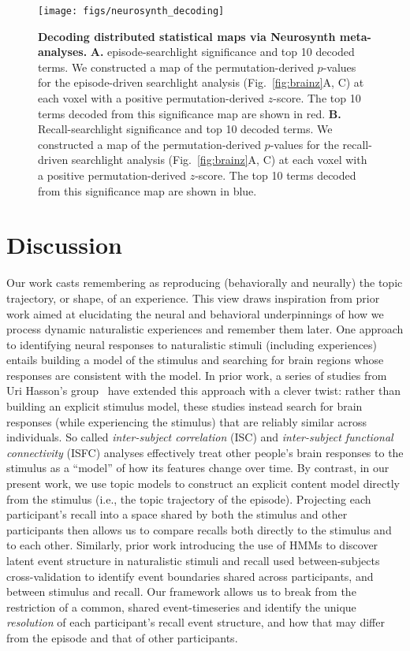 \documentclass{article}
\begin{document}
\begin{figure}[t]
\centering
\texttt{[image: figs/neurosynth\_decoding]}
\caption{\small \textbf{Decoding distributed statistical maps via Neurosynth meta-analyses.} \textbf{A.} episode-searchlight significance and top 10 decoded terms.  We constructed a map of the permutation-derived $p$-values for the episode-driven searchlight analysis (Fig.~\ref{fig:brainz}A, C) at each voxel with a positive permutation-derived $z$-score.  The top 10 terms decoded from this significance map are shown in red.  \textbf{B.} Recall-searchlight significance and top 10 decoded terms.  We constructed a map of the permutation-derived $p$-values for the recall-driven searchlight analysis (Fig.~\ref{fig:brainz}A, C) at each voxel with a positive permutation-derived $z$-score.  The top 10 terms decoded from this significance map are shown in blue.}
\label{fig:neurosynth}
\end{figure}
\FloatBarrier


\section*{Discussion}
\label{sec:discussion}

Our work casts remembering as reproducing (behaviorally and neurally) the topic trajectory, or shape, of an experience.  This view draws inspiration from prior work aimed at elucidating the neural and behavioral underpinnings of how we process dynamic naturalistic experiences and remember them later.  One approach to identifying neural responses to naturalistic stimuli (including experiences) entails building a model of the stimulus and searching for brain regions whose responses are consistent with the model.  In prior work, a series of studies from Uri Hasson's group~\citep{LernEtal11, SimoEtal16, ChenEtal17, BaldEtal17, ZadbEtal17} have extended this approach with a clever twist: rather than building an explicit stimulus model, these studies instead search for brain responses (while experiencing the stimulus) that are reliably similar across individuals.  So called \textit{inter-subject correlation} (ISC) and \textit{inter-subject functional connectivity} (ISFC) analyses effectively treat other people's brain responses to the stimulus as a ``model'' of how its features change over time.  By contrast, in our present work, we use topic models to construct an explicit content model directly from the stimulus (i.e., the topic trajectory of the episode).  Projecting each participant's recall into a space shared by both the stimulus and other participants then allows us to compare recalls both directly to the stimulus and to each other.  Similarly, prior work introducing the use of HMMs to discover latent event structure in naturalistic stimuli and recall \citep{BaldEtal17} used between-subjects cross-validation to identify event boundaries shared across participants, and between stimulus and recall.  Our framework allows us to break from the restriction of a common, shared event-timeseries and identify the unique \textit{resolution} of each participant's recall event structure, and how that may differ from the episode and that of other participants.
\end{document}
